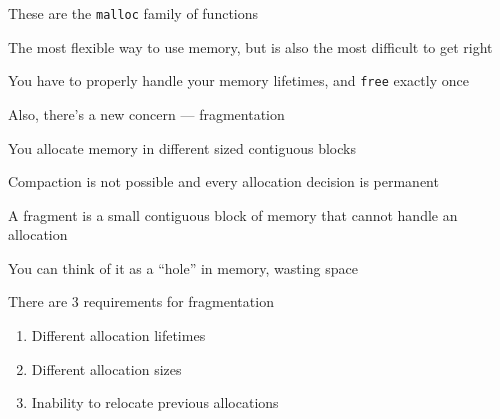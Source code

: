 \begin{slide}


    These are the \texttt{malloc} family of functions
    \medskip

    The most flexible way to use memory, but is also the most difficult to get
    right
    \medskip

    You have to properly handle your memory lifetimes, and \texttt{free}
    exactly once
    \medskip

    Also, there's a new concern --- fragmentation

\end{slide}

\begin{slide}


    You allocate memory in different sized contiguous blocks

    \leftspace{}Compaction is not possible and every allocation decision is
    permanent
    \medskip

    A fragment is a small contiguous block of memory that cannot handle an
    allocation

    \leftspace{}You can think of it as a ``hole'' in memory, wasting space
    \medskip

    There are 3 requirements for fragmentation
    \begin{enumerate}
        \item Different allocation lifetimes
        \item Different allocation sizes
        \item Inability to relocate previous allocations  
    \end{enumerate}

\end{slide}

